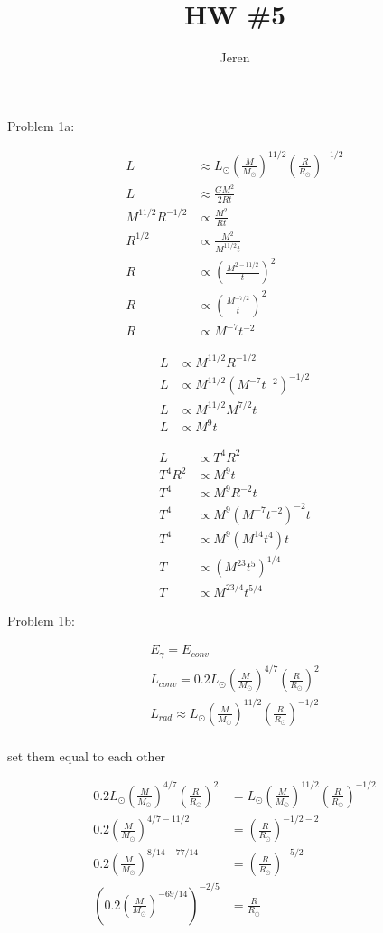\documentclass[10pt,a4paper,final]{article}
\author{Jeren}
\title{HW \#5}
\begin{document}
Problem 1a:

\begin{align}
L & \approx L_\odot \left( \frac{M}{M_\odot} \right)^{11/2} \left( \frac{R}{R_\odot} \right) ^{-1/2}\\
L & \approx \frac{GM^2}{2Rt}\\
M^{11/2} R^{-1/2} & \propto \frac{M^2}{Rt}\\
R^{1/2} & \propto \frac{M^2}{M^{11/2}t}\\
R & \propto \left( \frac{M^{2-{11/2}}}{t} \right)^2\\
R & \propto \left( \frac{M^{-7/2}}{t} \right)^2\\
R & \propto M^{-7}t^{-2}
\end{align}

\begin{align}
L & \propto M^{11/2}R^{-1/2}\\
L & \propto M^{11/2}(M^{-7}t^{-2})^{-1/2}\\
L & \propto M^{11/2}M^{7/2}t\\
L & \propto M^9 t
\end{align}

\begin{align}
L & \propto T^4R^2\\
T^4R^2 & \propto M^9 t\\
T^4 & \propto M^9 R^{-2} t\\
T^4 & \propto M^9 (M^{-7}t^{-2})^{-2} t\\
T^4 & \propto M^9 (M^{14}t^4)t\\
T & \propto (M^{23}t^5)^{1/4}\\
T & \propto M^{23/4} t^{5/4}
\end{align}

Problem 1b:

\begin{align}
E_\gamma = E_{conv}\\
L_{conv} = 0.2 L_\odot \left( \frac{M}{M_\odot} \right)^{4/7} \left( \frac{R}{R_\odot} \right)^2\\
L_{rad} \approx L_\odot \left( \frac{M}{M_\odot} \right)^{11/2} \left( \frac{R}{R_\odot} \right)^{-1/2}\\
\end{align}

set them equal to each other

\begin{align}
0.2 L_\odot \left( \frac{M}{M_\odot} \right)^{4/7} \left( \frac{R}{R_\odot} \right)^2 & = L_\odot \left( \frac{M}{M_\odot} \right)^{11/2} \left( \frac{R}{R_\odot} \right)^{-1/2}\\
0.2 \left( \frac{M}{M_\odot} \right) ^{4/7 - 11/2} & = \left( \frac{R}{R_\odot} \right)^{-1/2 -2}\\
0.2 \left( \frac{M}{M_\odot} \right)^{8/14 - 77/14} & = \left( \frac{R}{R_\odot} \right)^{-5/2}\\
\left( 0.2 \left( \frac{M}{M_\odot} \right)^{-69/14} \right)^{-2/5} & = \frac{R}{R_\odot}
\end{align}
\end{document}
